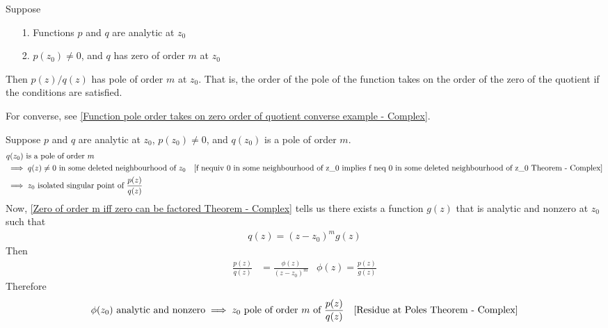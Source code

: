 \documentclass[12pt, english]{book}
\makeatletter
\renewenvironment{proof}[1][\proofname]{\par
	\pushQED{\qed}%
	\normalfont \topsep6\p@\@plus6\p@\relax
	\list{}{%
		\settowidth{\leftmargin}{\itshape\proofname:\hskip\labelsep}%
		\setlength{\labelwidth}{0pt}%
		\setlength{\itemindent}{-\leftmargin}%
	}%
	\item[\hskip\labelsep\itshape#1\@addpunct{:}]\ignorespaces
	}{ \popQED\endlist\@endpefalse}
\makeatother
\begin{document}
	\begin{theorem}
		 
		\label{Function pole order takes on zero order of quotient Theorem - Complex}
		Suppose
		\begin{itemize}
			\item[1.] Functions \(p\) and \(q\) are analytic at \(z_0\)
			\item[2.] \(p(z_0) \neq 0\), and \(q\) has zero of order \(m\) at \(z_0\)
		\end{itemize}
		Then \(p(z)/q(z)\) has pole of order \(m\) at \(z_0\). That is, the order of the pole of the function takes on the order of the zero of the quotient if the conditions are satisfied.
		
		For converse, see \cref{Function pole order takes on zero order of quotient converse example - Complex}.
	\end{theorem}
	\begin{proof}
		Suppose \(p\) and \(q\) are analytic at \(z_0\), \(p(z_0) \neq 0\), and \(q(z_0)\) is a pole of order \(m\).
		\begin{align*}
			&q(z_0) \text{ is a pole of order } m \\
			&\implies q(z)\neq 0 \text{ in some deleted neighbourhood of } z_0 
				& \text{\Cref{f nequiv 0 in some neighbourhood of z_0 implies f neq 0 in some deleted neighbourhood of z_0 Theorem - Complex}} \\
			&\implies z_0 \text{ isolated singular point of } \frac{p(z)}{q(z)}
		\end{align*}
		Now, \cref{Zero of order m iff zero can be factored Theorem - Complex} tells us there exists a function \(g(z)\) that is analytic and nonzero at \(z_0\) such that
		\begin{align*}
			q(z) = (z-z_0)^m g(z)
		\end{align*}
		Then
		\begin{align*}
			\frac{p(z)}{q(z)} &= \frac{\phi(z)}{(z-z_0)^m} & \phi(z) = \frac{p(z)}{g(z)}
		\end{align*}
		Therefore
		\begin{align*}
			\phi(z_0) \text{ analytic and nonzero}
			&\implies z_0 \text{ pole of order } m \text{ of } \frac{p(z)}{q(z)}
				& \text{\Cref{Residue at Poles Theorem - Complex}}
		\end{align*}
	\end{proof}
\end{document}
